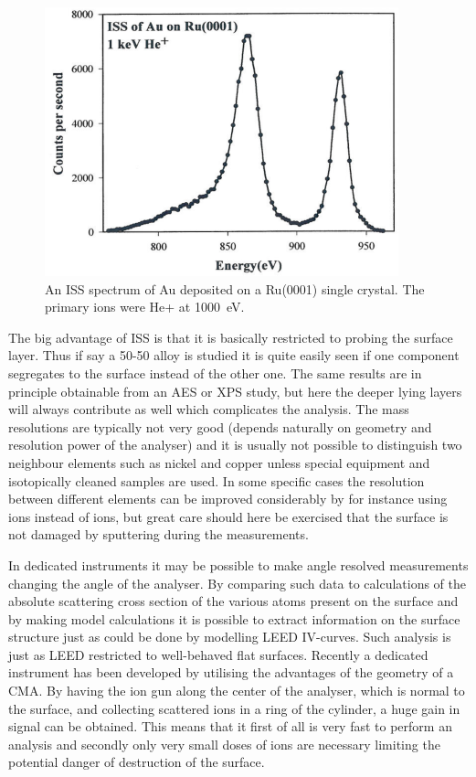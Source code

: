 \begin{figure}[h!]
	\begin{center}
	\includegraphics[scale=4]{figures/11_03.png}
	\caption{An ISS spectrum of Au deposited on a Ru(0001) single crystal. The primary ions were He+ at \SI{1000}{\electronvolt}.}
	\label{fig:auruiss}
	\end{center}
\end{figure}

The big advantage of ISS is that it is basically restricted to probing the surface layer. Thus if  say a 50-50 alloy is studied it is quite easily seen if one component segregates to the surface instead of the other one. The same results are in principle obtainable from an AES or XPS study, but here the deeper lying layers will always contribute as well which complicates the analysis. The mass resolutions are typically not very good (depends naturally on geometry and resolution power of the analyser) and it is usually not possible to distinguish two neighbour elements such as nickel and copper unless special equipment and isotopically cleaned samples are used. In some specific cases the resolution between different elements can be improved considerably by for instance using  ions instead of  ions, but great care should here be exercised that the surface is not damaged by sputtering during the measurements.

In dedicated instruments it may be possible to make angle resolved measurements changing the  angle of the analyser. By comparing such data to calculations of the absolute scattering cross section of the various atoms present on the surface and by making model calculations it is possible to extract information on the surface structure just as could be done by modelling LEED IV-curves. Such analysis is just as LEED restricted to well-behaved flat surfaces. Recently a dedicated instrument has been developed by \cite{Brongersma} utilising the advantages of the geometry of a CMA. By having the ion gun along the center of the analyser, which is normal to the surface, and collecting scattered ions in a ring  of the cylinder, a huge gain in signal can be obtained. This means that it first of all is very fast to perform an analysis and secondly only very small doses of ions are necessary limiting the potential danger of destruction of the surface.

